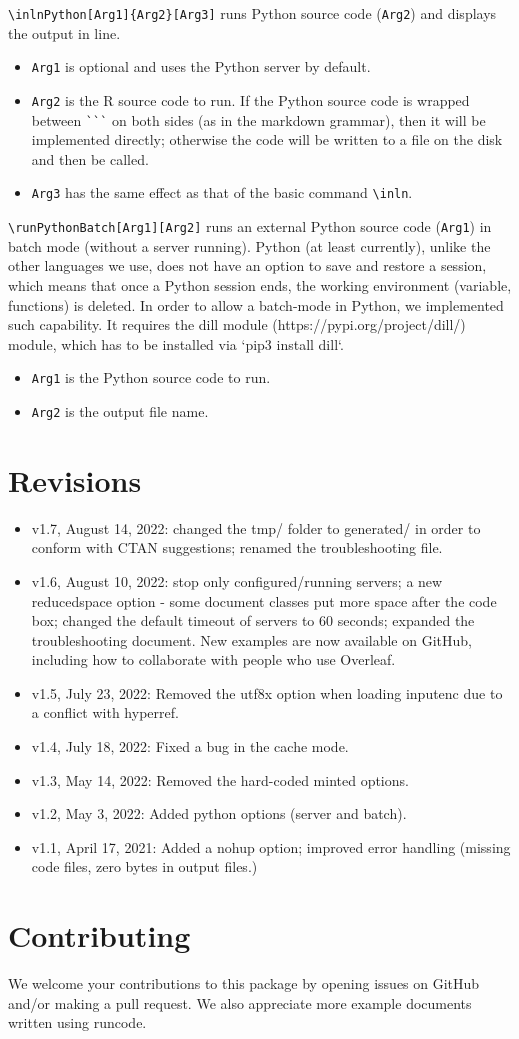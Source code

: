\documentclass{ltxdoc}
\begin{document}
\noindent \verb|\inlnPython[Arg1]{Arg2}[Arg3]| runs Python source code (\texttt{Arg2}) and displays the output in line.
\begin{itemize}
\item \texttt{Arg1} is optional and uses the Python server by default.
\item \texttt{Arg2} is the R source code to run. If the Python  source code is wrapped between \verb|```| on both sides (as in the markdown grammar), then it will be implemented directly; otherwise the code will be written to a file on the disk and then be called.
\item \texttt{Arg3} has the same effect as that of the basic command  \verb|\inln|.
\end{itemize}

\noindent \verb|\runPythonBatch[Arg1][Arg2]| runs an external Python source code (\texttt{Arg1}) in batch mode (without a server running). Python (at least currently), unlike the other languages we use, does not have an option to save and restore a session, which means that once a Python session ends, the working environment (variable, functions) is deleted. In order to allow a batch-mode in Python, we implemented such capability. It requires the dill module (https://pypi.org/project/dill/) module, which has to be installed via  `pip3 install dill`.
\begin{itemize}
\item \texttt{Arg1} is the Python source code to run.
\item \texttt{Arg2} is the output file name.
\end{itemize}

 


\section{Revisions}
\begin{itemize}
\item v1.7, August 14, 2022: changed the tmp/ folder to generated/ in order to conform with CTAN suggestions; renamed the troubleshooting file.
\item v1.6, August 10, 2022: stop only configured/running servers; a new reducedspace option - some document classes put more space after the code box; changed the default timeout of servers to 60 seconds; expanded the troubleshooting document. New examples are now available on GitHub, including how to collaborate with people who use Overleaf.
\item v1.5, July 23, 2022: Removed the utf8x option when loading inputenc due to a conflict with hyperref.
\item v1.4, July 18, 2022: Fixed a bug in the cache mode.
\item v1.3, May 14, 2022: Removed the hard-coded minted options.
\item v1.2, May 3, 2022: Added python options (server and batch).
\item v1.1, April 17, 2021: Added a nohup option; improved error handling (missing code files, zero bytes in output files.)
\end{itemize}


%
\section{Contributing}
We welcome your contributions to this package by opening issues on GitHub and/or making a pull request. We also appreciate more example documents written using \textsf{runcode}.
\end{document}
